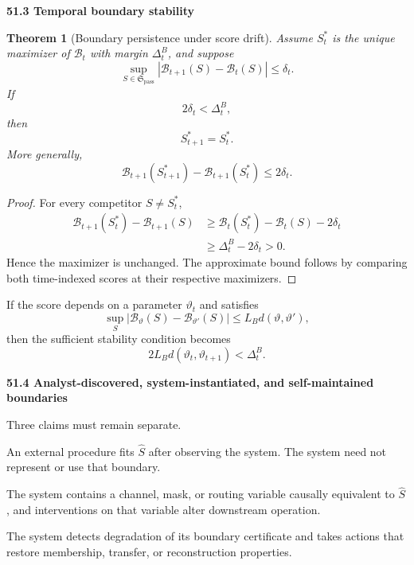 \documentclass[11pt,letterpaper]{article}
\newcommand{\subtopic}[1]{%
 \vspace{0.45em}
 {\bfseries\color{AccentColor} #1\par}
}
\theoremstyle{plain}
\newtheorem{theorem}{Theorem}
\theoremstyle{definition}
\begin{document}
\subtopic{51.3 Temporal boundary stability}

\begin{theorem}[Boundary persistence under score drift]
\label{thm:boundary-drift-stability}
Assume \(S_t^*\) is the unique maximizer of \(\mathcal B_t\) with margin
\(\Delta_t^B\), and suppose
\[
\sup_{S\in\mathfrak S_{\mathrm{pass}}}
|\mathcal B_{t+1}(S)-\mathcal B_t(S)|
\leq\delta_t.
\]
If
\[
2\delta_t<\Delta_t^B,
\]
then
\[
\boxed{S_{t+1}^*=S_t^*.}
\]
More generally,
\[
\mathcal B_{t+1}(S_{t+1}^*)
-
\mathcal B_{t+1}(S_t^*)
\leq2\delta_t.
\]
\end{theorem}

\begin{proof}
For every competitor \(S\neq S_t^*\),
\[
\begin{aligned}
\mathcal B_{t+1}(S_t^*)-
\mathcal B_{t+1}(S)
&\geq
\mathcal B_t(S_t^*)-
\mathcal B_t(S)-2\delta_t\\
&\geq
\Delta_t^B-2\delta_t>0.
\end{aligned}
\]
Hence the maximizer is unchanged. The approximate bound follows by comparing
both time-indexed scores at their respective maximizers.
\end{proof}

If the score depends on a parameter \(\vartheta_t\) and satisfies
\[
\sup_S
|\mathcal B_{\vartheta}(S)-\mathcal B_{\vartheta'}(S)|
\leq
L_Bd(\vartheta,\vartheta'),
\]
then the sufficient stability condition becomes
\[
2L_Bd(\vartheta_t,\vartheta_{t+1})
<
\Delta_t^B.
\]

\subtopic{51.4 Analyst-discovered, system-instantiated, and self-maintained boundaries}

Three claims must remain separate.

\begin{description}[leftmargin=2.1em,style=nextline]
\item[Analyst-discovered boundary.]
An external procedure fits \(\widehat S\) after observing the system. The
system need not represent or use that boundary.

\item[System-instantiated boundary.]
The system contains a channel, mask, or routing variable causally equivalent to
\(\widehat S\), and interventions on that variable alter downstream operation.

\item[Self-maintained boundary.]
The system detects degradation of its boundary certificate and takes actions
that restore membership, transfer, or reconstruction properties.
\end{description}
\end{document}
